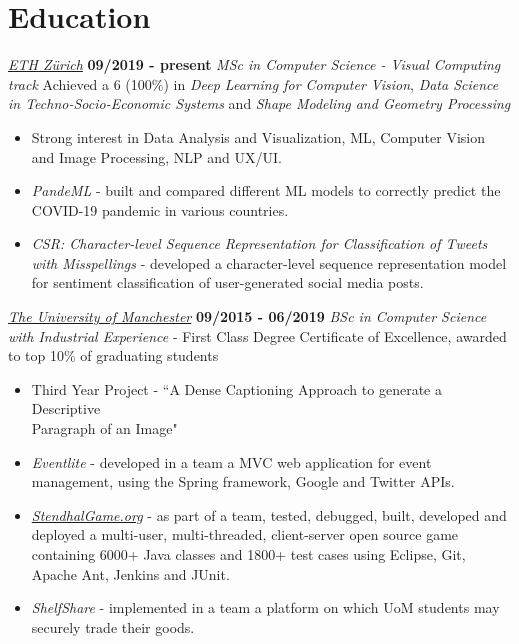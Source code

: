 \documentclass[]{friggeri-cv}
\begin{document}
\section{\color{red}Education}
\begin{entrylist}
    \entry
    {}
    {\large\emph{\href{https://inf.ethz.ch/studies/master/master-cs.html}{ETH Zürich}}}
    {\textbf{09/2019 - present}}
    {\large\emph{MSc in Computer Science - Visual Computing track}}
    {Achieved a 6 (100\%) in \emph{Deep Learning for Computer Vision}, \emph{Data Science in Techno-Socio-Economic Systems} and \emph{Shape Modeling and Geometry Processing}}
    \begin{itemize}
        \item Strong interest in Data Analysis and Visualization, ML, Computer Vision and Image Processing, NLP and UX/UI.
        \item \emph{PandeML} - built and compared different ML models to correctly predict the COVID-19 pandemic in various countries.
        \item \emph{CSR: Character-level Sequence Representation for Classification of Tweets with Misspellings} - developed a character-level sequence representation  model for sentiment classification of user-generated social media posts.
    \end{itemize}
\medskip
  \entry
    {}
    {\large\emph{\href{http://www.manchester.ac.uk/}{The University of Manchester}}}
    {\textbf{09/2015 - 06/2019}}
    {\large\emph{BSc in Computer Science with Industrial Experience} - First Class Degree}
    {Certificate of Excellence, awarded to top 10\% of graduating students}
    \begin{itemize}
        \item Third Year Project - ``A Dense Captioning Approach to generate a Descriptive \\Paragraph of an Image"
        \item \emph{Eventlite} - developed in a team a MVC web application for event management, using the Spring framework, Google and Twitter APIs.
        \item \emph{\href{https://stendhalgame.org/}{StendhalGame.org}} - as part of a team, tested, debugged, built, developed and deployed a multi-user, multi-threaded, client-server open source game containing 6000+ Java classes and 1800+ test cases using Eclipse, Git, Apache Ant, Jenkins and JUnit.
        \item \emph{ShelfShare} - implemented in a team a platform on which UoM students may securely trade their goods.
    \end{itemize}
\end{entrylist}
\end{document}
